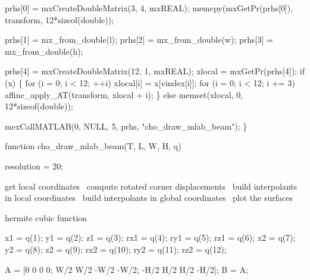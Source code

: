     prhs[0] = mxCreateDoubleMatrix(3, 4, mxREAL);
    memcpy(mxGetPr(prhs[0]), transform, 12*sizeof(double));

    prhs[1] = mx_from_double(l);
    prhs[2] = mx_from_double(w);
    prhs[3] = mx_from_double(h);

    prhs[4] = mxCreateDoubleMatrix(12, 1, mxREAL);
    xlocal  = mxGetPr(prhs[4]);
    if (x) \{
        for (i = 0; i < 12; ++i)
            xlocal[i] = x[vindex[i]];
        for (i = 0; i < 12; i += 3)
            affine_apply_AT(transform, xlocal + i);
    \} else
        memset(xlocal, 0, 12*sizeof(double));

    mexCallMATLAB(0, NULL, 5, prhs, "cho_draw_mlab_beam");
\}

\nwendcode{}\nwdocspar

\nwenddocs{}\endmoddef
function cho_draw_mlab_beam(T, L, W, H, q)

resolution = 20;

\LA{}get local coordinates~{\nwtagstyle{}}\RA{}
\LA{}compute rotated corner displacements~{\nwtagstyle{}}\RA{}
\LA{}build interpolants in local coordinates~{\nwtagstyle{}}\RA{}
\LA{}build interpolants in global coordinates~{\nwtagstyle{}}\RA{}
\LA{}plot the surfaces~{\nwtagstyle{}}\RA{}

\LA{}hermite cubic function~{\nwtagstyle{}}\RA{}
\nwendcode{}\nwdocspar

\nwenddocs{}\endmoddef
 x1 =  q(1);  y1 =  q(2);  z1 =  q(3);
rx1 =  q(4); ry1 =  q(5); rz1 =  q(6);
 x2 =  q(7);  y2 =  q(8);  z2 =  q(9);
rx2 = q(10); ry2 = q(11); rz2 = q(12);

\nwendcode{}\nwdocspar

\nwenddocs{}\endmoddef
A = [0    0    0    0;
     W/2  W/2 -W/2 -W/2;
    -H/2  H/2  H/2 -H/2];
B = A;

